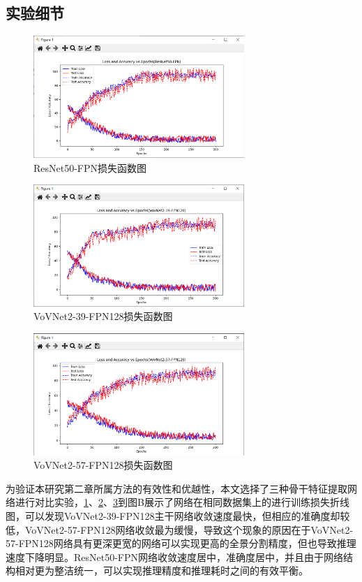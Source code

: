 \subsection{实验细节}
\begin{figure}[htb]
    \centering
    \includegraphics[width=8cm]{fig/chap3/res1.png}
    \caption{ResNet50-FPN损失函数图} 
    \label{fig:f3a}
\end{figure}
\begin{figure}[htb]
    \centering
    \includegraphics[width=8cm]{fig/chap3/vol1.png}
    \caption{VoVNet2-39-FPN128损失函数图} 
    \label{fig:f3b}
\end{figure}
\begin{figure}[htb]
    \centering
    \includegraphics[width=8cm]{fig/chap3/vol2.png}
    \caption{VoVNet2-57-FPN128损失函数图} 
    \label{fig:f3c}
\end{figure}
为验证本研究第二章所属方法的有效性和优越性，本文选择了三种骨干特征提取网络进行对比实验，\cref*{fig:f3a}、\cref*{fig:f3b}、\cref*{fig:f3c}到图B展示了网络在相同数据集上的进行训练损失折线图，可以发现VoVNet2-39-FPN128主干网络收敛速度最快，但相应的准确度却较低，VoVNet2-57-FPN128网络收敛最为缓慢，导致这个现象的原因在于VoVNet2-57-FPN128网络具有更深更宽的网络可以实现更高的全景分割精度，但也导致推理速度下降明显。ResNet50-FPN网络收敛速度居中，准确度居中，并且由于网络结构相对更为整洁统一，可以实现推理精度和推理耗时之间的有效平衡。

